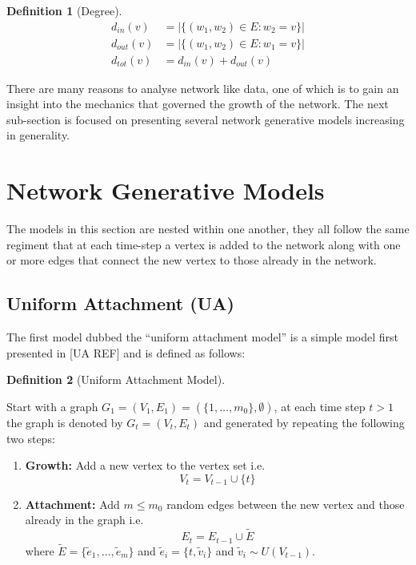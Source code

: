 \documentclass[
  10pt,
  a4paper,
]{scrreprt}
\providecommand{\tightlist}{%
  \setlength{\itemsep}{0pt}\setlength{\parskip}{0pt}}\usepackage{longtable,booktabs,array}
\theoremstyle{plain}
\theoremstyle{definition}
\newtheorem{definition}{Definition}[section]
\theoremstyle{remark}
\begin{document}
{\begin{definition}[Degree]
\begin{align*}
d_{in}(v)&= |\{(w_1,w_2)\in E: w_2=v \}|\\
d_{out}(v) &= |\{(w_1,w_2)\in E: w_1=v \}|\\
d_{tot}(v) &= d_{in}(v) + d_{out}(v)
\end{align*}

\end{definition}

There are many reasons to analyse network like data, one of which is to
gain an insight into the mechanics that governed the growth of the
network. The next sub-section is focused on presenting several network
generative models increasing in generality.

\hypertarget{network-generative-models}{%
\section{Network Generative Models}\label{network-generative-models}}

The models in this section are nested within one another, they all
follow the same regiment that at each time-step a vertex is added to the
network along with one or more edges that connect the new vertex to
those already in the network.

\hypertarget{uniform-attachment-ua}{%
\subsection{Uniform Attachment (UA)}\label{uniform-attachment-ua}}

The first model dubbed the ``uniform attachment model'' is a simple
model first presented in {[}UA REF{]} and is defined as follows:

\begin{definition}[Uniform Attachment
Model]\protect\hypertarget{def-ua}{}\label{def-ua}

Start with a graph \(G_1 = (V_1, E_1) = (\{1,\ldots,m_0\}, \emptyset)\),
at each time step \(t>1\) the graph is denoted by \(G_t=(V_t, E_t)\) and
generated by repeating the following two steps:

\begin{enumerate}
\def\labelenumi{\arabic{enumi}.}
\tightlist
\item
  \textbf{Growth:} Add a new vertex to the vertex set i.e.~ \[
  V_t=V_{t-1}\cup\{t\}
  \]
\item
  \textbf{Attachment:} Add \(m\le m_0\) random edges between the new
  vertex and those already in the graph i.e.~ \[
  E_t = E_{t-1} \cup \tilde E
  \] where \(\tilde E = \{\tilde e_1,\ldots, \tilde e_m\}\) and
  \(\tilde e_i = \{t,\tilde v_i\}\) and \(\tilde v_i \sim U(V_{t-1})\).
\end{enumerate}


\end{definition}}
\end{document}
